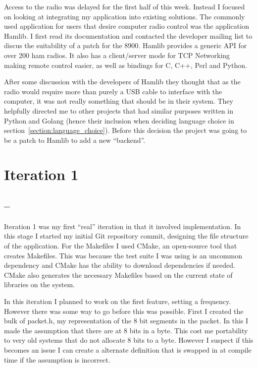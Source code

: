 Access to the radio was delayed for the first half of this week. Instead I focused on looking at integrating my application into existing solutions. The commonly used application for users that desire computer radio control was the application Hamlib\cite{hamlib}. I first read its documentation and contacted the developer mailing list to discus the suitability of a patch for the \gls{8900}. Hamlib provides a generic API for over 200 ham radios. It also has a client/server mode for TCP Networking making remote control easier, as well as bindings for C, C++, Perl and Python.

After some discussion with the developers of Hamlib they thought that as the radio would require more than purely a USB cable to interface with the computer, it was not really something that should be in their system. They helpfully directed me to other projects that had similar purposes written in Python and Golang (hence their inclusion when deciding language choice in section~\ref{section:language_choice}). Before this decision the project was going to be a patch to Hamlib to add a new ``backend''. 

\section{Iteration 1}
\subsection*{ -- }
Iteration 1 was my first ``real'' iteration in that it involved implementation. In this stage I started my initial Git repository commit, designing the file structure of the application. For the Makefiles I used CMake, an open-source tool that creates Makefiles. This was because the test suite I was using is an uncommon dependency and CMake has the ability to download dependencies if needed. CMake also generates the necessary Makefiles based on the current state of libraries on the system. 

In this iteration I planned to work on the first feature, setting a frequency. However there was some way to go before this was possible. First I created the bulk of packet.h, my representation of the 8 bit segments in the packet. In this I made the assumption that there are at 8 bits in a byte. This cost me portability to very old systems that do not allocate 8 bits to a byte. However I suspect if this becomes an issue I can create a alternate definition that is swapped in at compile time if the assumption is incorrect.

